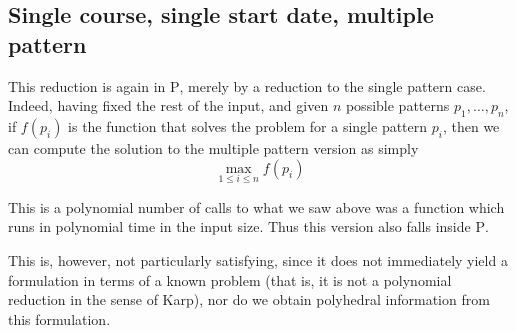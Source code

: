 \subsection{Single course, single start date, multiple pattern}

This reduction is again in \textsc{P}, merely by a reduction to the single pattern case. Indeed, having fixed the rest of the input, and given $n$ possible patterns $p_1, \dots, p_n$, if $f(p_i)$ is the function that solves the problem for a single pattern $p_i$, then we can compute the solution to the multiple pattern version as simply
$$
\max_{1 \le i \le n} f(p_i)
$$

This is a polynomial number of calls to what we saw above was a function which runs in polynomial time in the input size. Thus this version also falls inside \textsc{P}.

This is, however, not particularly satisfying, since it does not immediately yield a formulation in terms of a known problem (that is, it is not a polynomial reduction in the sense of Karp), nor do we obtain polyhedral information from this formulation.

